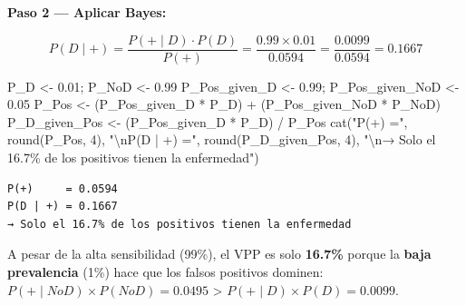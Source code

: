 \documentclass[
  letterpaper,
  DIV=11,
  numbers=noendperiod]{scrartcl}
\newenvironment{Shaded}{\begin{snugshade}}{\end{snugshade}}
\newcommand{\DecValTok}[1]{\textcolor[rgb]{0.68,0.00,0.00}{#1}}
\newcommand{\FloatTok}[1]{\textcolor[rgb]{0.68,0.00,0.00}{#1}}
\newcommand{\FunctionTok}[1]{\textcolor[rgb]{0.28,0.35,0.67}{#1}}
\newcommand{\NormalTok}[1]{\textcolor[rgb]{0.00,0.23,0.31}{#1}}
\newcommand{\OtherTok}[1]{\textcolor[rgb]{0.00,0.23,0.31}{#1}}
\newcommand{\SpecialCharTok}[1]{\textcolor[rgb]{0.37,0.37,0.37}{#1}}
\newcommand{\StringTok}[1]{\textcolor[rgb]{0.13,0.47,0.30}{#1}}
\begin{document}
\textbf{Paso 2 --- Aplicar Bayes:}

\[P(D \mid +) = \frac{P(+ \mid D) \cdot P(D)}{P(+)} = \frac{0.99 \times 0.01}{0.0594} = \frac{0.0099}{0.0594} = 0.1667\]

\begin{Shaded}
\begin{Highlighting}[]
\NormalTok{P\_D }\OtherTok{\textless{}{-}} \FloatTok{0.01}\NormalTok{; P\_NoD }\OtherTok{\textless{}{-}} \FloatTok{0.99}
\NormalTok{P\_Pos\_given\_D }\OtherTok{\textless{}{-}} \FloatTok{0.99}\NormalTok{; P\_Pos\_given\_NoD }\OtherTok{\textless{}{-}} \FloatTok{0.05}
\NormalTok{P\_Pos }\OtherTok{\textless{}{-}}\NormalTok{ (P\_Pos\_given\_D }\SpecialCharTok{*}\NormalTok{ P\_D) }\SpecialCharTok{+}\NormalTok{ (P\_Pos\_given\_NoD }\SpecialCharTok{*}\NormalTok{ P\_NoD)}
\NormalTok{P\_D\_given\_Pos }\OtherTok{\textless{}{-}}\NormalTok{ (P\_Pos\_given\_D }\SpecialCharTok{*}\NormalTok{ P\_D) }\SpecialCharTok{/}\NormalTok{ P\_Pos}
\FunctionTok{cat}\NormalTok{(}\StringTok{"P(+)     ="}\NormalTok{, }\FunctionTok{round}\NormalTok{(P\_Pos, }\DecValTok{4}\NormalTok{),}
    \StringTok{"}\SpecialCharTok{\textbackslash{}n}\StringTok{P(D | +) ="}\NormalTok{, }\FunctionTok{round}\NormalTok{(P\_D\_given\_Pos, }\DecValTok{4}\NormalTok{),}
    \StringTok{"}\SpecialCharTok{\textbackslash{}n}\StringTok{→ Solo el 16.7\% de los positivos tienen la enfermedad"}\NormalTok{)}
\end{Highlighting}
\end{Shaded}

\begin{verbatim}
P(+)     = 0.0594 
P(D | +) = 0.1667 
→ Solo el 16.7% de los positivos tienen la enfermedad
\end{verbatim}

\begin{tcolorbox}[enhanced jigsaw, arc=.35mm, bottomrule=.15mm, bottomtitle=1mm, breakable, colback=white, colbacktitle=quarto-callout-warning-color!10!white, colframe=quarto-callout-warning-color-frame, coltitle=black, left=2mm, leftrule=.75mm, opacityback=0, opacitybacktitle=0.6, rightrule=.15mm, title=\textcolor{quarto-callout-warning-color}{\faExclamationTriangle}\hspace{0.5em}{Warning}, titlerule=0mm, toprule=.15mm, toptitle=1mm]

A pesar de la alta sensibilidad (99\%), el VPP es solo \textbf{16.7\%}
porque la \textbf{baja prevalencia} (1\%) hace que los falsos positivos
dominen: \(P(+ \mid NoD) \times P(NoD) = 0.0495\) \textgreater{}
\(P(+ \mid D) \times P(D) = 0.0099\).

\end{tcolorbox}
\end{document}
